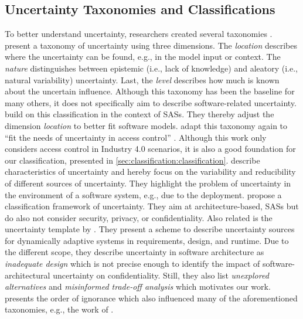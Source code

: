 \subsection{Uncertainty Taxonomies and Classifications}

To better understand uncertainty, researchers created several taxonomies \cite{bures_capturing_2020,esfahani_uncertainty_2013,mahdavi-hezavehi_classification_2017,perez-palacin_uncertainties_2014,ramirez_taxonomy_2012,walker_defining_2003,PSUM,camara_uncertainty_2017}.
\textcite{walker_defining_2003} present a taxonomy of uncertainty using three dimensions. 
The \emph{location} describes where the uncertainty can be found, e.g., in the model input or context. 
The \emph{nature} distinguishes between epistemic (i.e., lack of knowledge) and aleatory (i.e., natural variability) uncertainty. 
Last, the \emph{level} describes how much is known about the uncertain influence.
Although this taxonomy has been the baseline for many others, it does not specifically aim to describe software-related uncertainty.
\textcite{perez-palacin_uncertainties_2014} build on this classification in the context of \acp{SAS}. 
They thereby adjust the dimension \emph{location} to better fit software models.
\textcite{bures_capturing_2020} adapt this taxonomy again to \enquote{fit the needs of uncertainty in access control} \cite{bures_capturing_2020}.
Although this work only considers access control in Industry 4.0 scenarios, it is also a good foundation for our classification, presented in \autoref{sec:classification:classification}.
\textcite{esfahani_uncertainty_2013} describe characteristics of uncertainty and hereby focus on the variability and reducibility of different sources of uncertainty.
They highlight the problem of uncertainty in the environment of a software system, e.g., due to the deployment.
\textcite{mahdavi-hezavehi_classification_2017} propose a classification framework of uncertainty.
They aim at architecture-based, \acp{SAS} but do also not consider security, privacy, or confidentiality.
Also related is the uncertainty template by \textcite{ramirez_taxonomy_2012}.
They present a scheme to describe uncertainty sources for dynamically adaptive systems in requirements, design, and runtime.
Due to the different scope, they describe uncertainty in software architecture as \emph{inadequate design} which is not precise enough to identify the impact of software-architectural \cite{hahner_classification_2023} uncertainty on confidentiality.
Still, they also list \emph{unexplored alternatives} and \emph{misinformed trade-off analysis} which motivates our work.
\textcite{armour_five_2000} presents the order of ignorance which also influenced many of the aforementioned taxonomies, e.g., the work of \textcite{perez-palacin_uncertainties_2014}.

